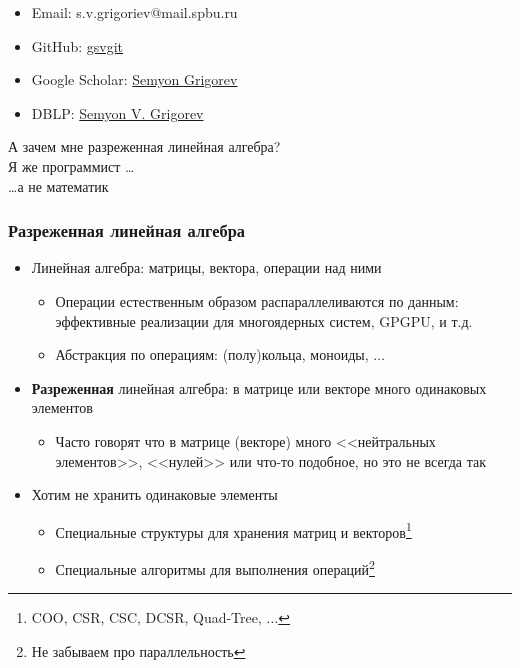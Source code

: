 \documentclass[xcolor=table,aspectratio=169]{beamer}
\begin{document}
\begin{frame}[fragile]
\begin{minipage}[t]{0.29\textwidth}
\begin{center}
  \end{center}
  {\scriptsize
\begin{itemize}    
  \item Email: s.v.grigoriev@mail.spbu.ru
  \item GitHub: \href{https://github.com/gsvgit}{gsvgit}
  \item Google Scholar: \href{https://scholar.google.com/citations?hl=ru&user=kP4dqUAAAAAJ&view_op=list_works&sortby=pubdate}{Semyon Grigorev}
  \item DBLP: \href{https://dblp.org/pid/181/9903.html}{Semyon V. Grigorev}
\end{itemize}
  }
\end{minipage}
\end{frame}

\begin{frame}
  \begin{center}
    {\huge А зачем мне разреженная линейная алгебра?}
     \\
     Я же программист \ldots 
     \\
     {\tiny \ldots а не математик}
  \end{center}
\end{frame}

\begin{frame}[fragile]
  \frametitle{Разреженная линейная алгебра}
  \begin{itemize}
    \item Линейная алгебра: матрицы, вектора, операции над ними
    \begin{itemize}
      \item Операции естественным образом распараллеливаются по данным: эффективные реализации для многоядерных систем, GPGPU, и т.д.
      \item Абстракция по операциям: (полу)кольца, моноиды, $\ldots$
    \end{itemize}
    \item \textbf{Разреженная} линейная алгебра: в матрице или векторе много одинаковых элементов
    \begin{itemize}
      \item Часто говорят что в матрице (векторе) много <<нейтральных элементов>>, <<нулей>> или что-то подобное, но это не всегда так
    \end{itemize}
    \item Хотим не хранить одинаковые элементы
    \begin{itemize}
      \item Специальные структуры для хранения матриц и векторов\footnote{COO, CSR, CSC, DCSR, Quad-Tree, $\ldots$}
      \item Специальные алгоритмы для выполнения операций\footnote{Не забываем про параллельность}
    \end{itemize}
  \end{itemize}
\end{frame}
\end{document}
